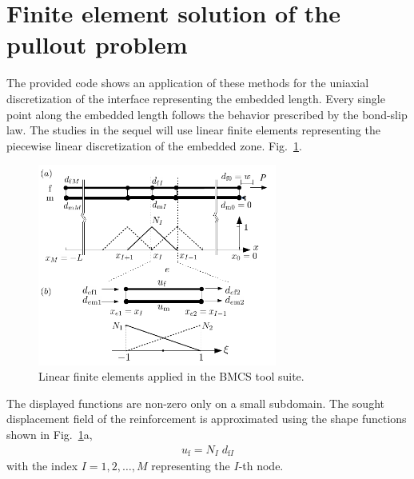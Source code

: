 \documentclass[main.tex]{subfiles}
\begin{document}
\section{Finite element solution of the pullout problem}
\label{SEC:finite_element_pullout}

The provided code shows an application of these methods for the uniaxial discretization of the interface representing the embedded length. Every single point along the embedded length follows the behavior prescribed by the bond-slip law. The studies in the sequel will use linear finite elements representing the piecewise linear discretization of the embedded zone. Fig.~\ref{FIGLinearFiniteElements}.  
\begin{figure}[ht]
	\centering
  \includegraphics[width=0.7\textwidth]{fig/Lecture03/fe_i.pdf}
	\caption{Linear finite elements applied in the BMCS tool suite.}
	\label{FIGLinearFiniteElements}
\end{figure}
The displayed functions are non-zero only on a small subdomain. 
The sought displacement field of the reinforcement is approximated using the shape functions shown in Fig.~\ref{FIGLinearFiniteElements}a,
\begin{align}
 \label{eq:u_c_ansatz}
\nonumber
 u_\mathrm{f} = N_{I} \; d_{\mathrm{f}I}
\end{align}
with the index $I = 1,2,\dots, M$ representing the $I$-th node. 

\end{document}
